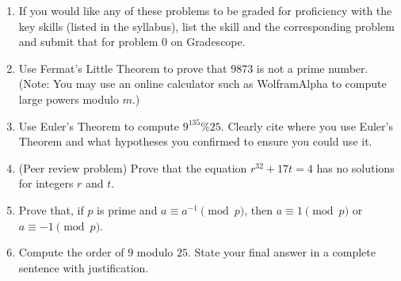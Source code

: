 \documentclass[12pt]{article}
\begin{document}
\begin{enumerate}
\item[0.] If you would like any of these problems to be graded for proficiency with the key skills (listed in the syllabus), list the skill and the corresponding problem and submit that for problem 0 on Gradescope. 
 \item Use Fermat's Little Theorem to prove that $9873$ is not a prime number.  (Note: You may use an online calculator such as WolframAlpha to compute large powers modulo $m$.)
 
 \item Use Euler's Theorem to compute $9^{135} \%{25}$.  Clearly cite where you use Euler's Theorem and what hypotheses you confirmed to ensure you could use it.


\item (Peer review problem) Prove that the equation $r^{32}+17t=4$ has no solutions for integers $r$ and $t$. 

\item Prove that, if $p$ is prime and $a\equiv a^{-1}\pmod{p}$, then $a\equiv 1\pmod{p}$ or $a\equiv -1\pmod{p}$. 

\item Compute the order of $9$ modulo $25$. State your final answer in a complete sentence with justification. 

\end{enumerate}
\end{document}
